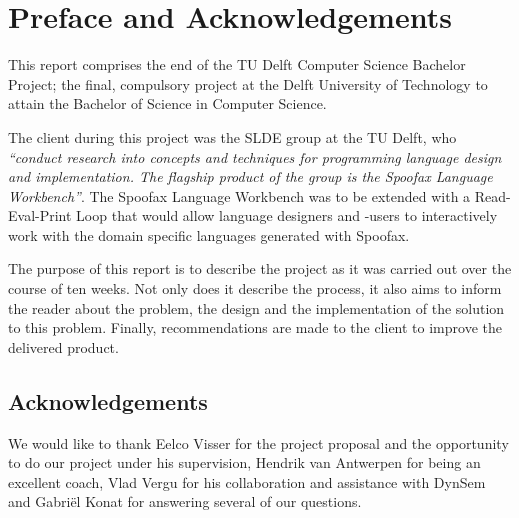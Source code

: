 \chapter{Preface and Acknowledgements}
\label{cha:preface-acks}

This report comprises the end of the TU Delft Computer Science Bachelor Project;
the final, compulsory project at the Delft University of Technology to attain
the Bachelor of Science in Computer Science.

The client during this project was the SLDE group at the TU Delft, who
\textit{``conduct research into concepts and techniques for programming language
design and implementation. The flagship product of the group is the Spoofax
Language Workbench''}. The Spoofax Language Workbench was to be extended with a
Read-Eval-Print Loop that would allow language designers and -users to
interactively work with the domain specific languages generated with Spoofax.

The purpose of this report is to describe the project as it was carried out over
the course of ten weeks. Not only does it describe the process, it also aims to
inform the reader about the problem, the design and the implementation of the
solution to this problem. Finally, recommendations are made to the client to
improve the delivered product.

\section*{Acknowledgements}

We would like to thank Eelco Visser for the project proposal and the
opportunity to do our project under his supervision, Hendrik van Antwerpen for
being an excellent coach, Vlad Vergu for his collaboration and assistance with
DynSem and Gabri\"el Konat for answering several of our questions.

